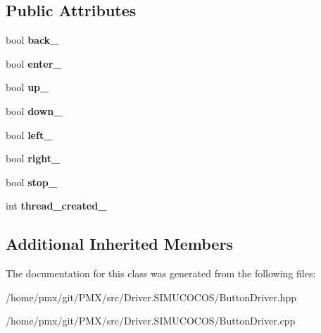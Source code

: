 \subsection*{Public Attributes}
\begin{DoxyCompactItemize}
\item 
\mbox{\label{classButtonDriver_a654e093ddf9b4d2e14d4621392803c7d}} 
bool {\bfseries back\+\_\+}
\item 
\mbox{\label{classButtonDriver_a4557dbb5ab1da2ac7efd1d002552a981}} 
bool {\bfseries enter\+\_\+}
\item 
\mbox{\label{classButtonDriver_a5315bf1d390d8758d477f2c6199cba7e}} 
bool {\bfseries up\+\_\+}
\item 
\mbox{\label{classButtonDriver_adccdba49592a72cc6a9386a176966e83}} 
bool {\bfseries down\+\_\+}
\item 
\mbox{\label{classButtonDriver_af1f6e1519607dfea45da9f9fbb47000d}} 
bool {\bfseries left\+\_\+}
\item 
\mbox{\label{classButtonDriver_a29c2ab016aaea30be0c1c122ce7e543f}} 
bool {\bfseries right\+\_\+}
\item 
\mbox{\label{classButtonDriver_a91f4dc61a9f23814f5057389055da1ac}} 
bool {\bfseries stop\+\_\+}
\item 
\mbox{\label{classButtonDriver_aaa72b659bc63436d5d876b24caf5bf55}} 
int {\bfseries thread\+\_\+created\+\_\+}
\end{DoxyCompactItemize}
\subsection*{Additional Inherited Members}


The documentation for this class was generated from the following files\+:\begin{DoxyCompactItemize}
\item 
/home/pmx/git/\+P\+M\+X/src/\+Driver.\+S\+I\+M\+U\+C\+O\+C\+O\+S/Button\+Driver.\+hpp\item 
/home/pmx/git/\+P\+M\+X/src/\+Driver.\+S\+I\+M\+U\+C\+O\+C\+O\+S/Button\+Driver.\+cpp\end{DoxyCompactItemize}
